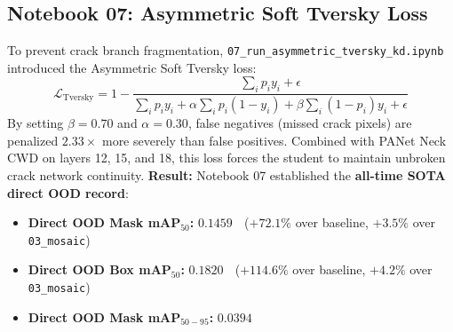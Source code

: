 \documentclass[11pt,a4paper]{article}
\begin{document}
\subsection{Notebook 07: Asymmetric Soft Tversky Loss}
To prevent crack branch fragmentation, \texttt{07\_run\_asymmetric\_tversky\_kd.ipynb} introduced the Asymmetric Soft Tversky loss:
\begin{equation}
  \mathcal{L}_{\text{Tversky}} = 1 - \frac{\sum_i p_i y_i + \epsilon}{\sum_i p_i y_i + \alpha \sum_i p_i (1 - y_i) + \beta \sum_i (1 - p_i) y_i + \epsilon}
\end{equation}
By setting $\beta = 0.70$ and $\alpha = 0.30$, false negatives (missed crack pixels) are penalized $2.33\times$ more severely than false positives. 
Combined with PANet Neck CWD on layers 12, 15, and 18, this loss forces the student to maintain unbroken crack network continuity.
\textbf{Result:} Notebook 07 established the \textbf{all-time SOTA direct OOD record}:
\begin{itemize}[leftmargin=1.5em]
  \item \textbf{Direct OOD Mask mAP$_{50}$:} $\mathbf{0.1459}$ 👑 ($+72.1\%$ over baseline, $+3.5\%$ over \texttt{03\_mosaic})
  \item \textbf{Direct OOD Box mAP$_{50}$:} $\mathbf{0.1820}$ 👑 ($+114.6\%$ over baseline, $+4.2\%$ over \texttt{03\_mosaic})
  \item \textbf{Direct OOD Mask mAP$_{50-95}$:} $\mathbf{0.0394}$ 👑
\end{itemize}
\end{document}
